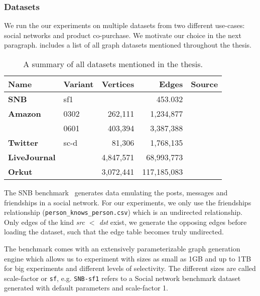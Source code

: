 \subsubsection{Datasets}
We run the our experiments on multiple datasets from two different use-cases: social networks and product co-purchase.
We motivate our choice in the next paragraph.
 includes a list of all graph datasets mentioned throughout the thesis.

\begin{table}[]
    \centering
    \begin{tabular}{llrrl} \toprule
        Name    & Variant              &  Vertices   & Edges          & Source          \\ \midrule
        \textbf{SNB}         & sf1     &             &  453.032       & \cite{snb}      \\
        \textbf{Amazon}      & 0302    & 262,111     &  1,234,877     & \cite{snapnets} \\
                             & 0601    & 403,394     &  3,387,388     & \cite{snapnets} \\
        \textbf{Twitter}     & sc-d    & 81,306      &  1,768,135     & \cite{snapnets} \\
        \textbf{LiveJournal} &         & 4,847,571   & 68,993,773     & \cite{snapnets} \\
        \textbf{Orkut}       &         & 3,072,441   & 117,185,083    & \cite{snapnets} \\ \bottomrule
    \end{tabular}
    \caption{A summary of all datasets mentioned in the thesis.}
    \label{table:datasets}
\end{table}

The SNB benchmark~\cite{snb} generates data emulating the posts, messages and friendships in a social network.
For our experiments, we only use the friendships relationship (\texttt{person\_knows\_person.csv}) which is an undirected relationship.
Only edges of the kind \textit{src $<$ dst} exist, we generate the opposing edges before loading the dataset, such
that the edge table becomes truly undirected.

The benchmark comes with an extensively parameterizable graph generation engine
which allows us to experiment with sizes as small as 1GB and up to 1TB for big experiments and different levels of selectivity.
The different sizes are called scale-factor or \texttt{sf}, e.g. \texttt{SNB-sf1} refers to a Social network benchmark dataset generated with
default parameters and scale-factor 1.

